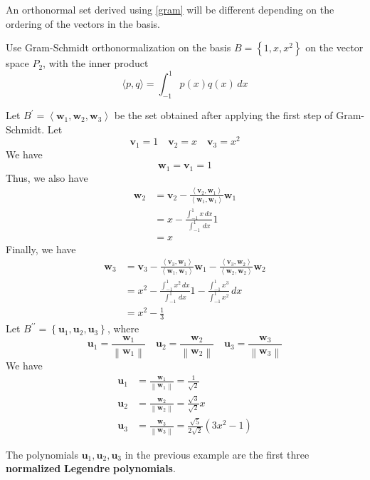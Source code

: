 \begin{remark}
    An orthonormal set derived using \ref{gram} will be different depending on the ordering of the vectors in the basis.
\end{remark}
\begin{exercise}
    Use Gram-Schmidt orthonormalization on the basis \(B=\left\{ 1,x,x^2 \right\} \) on the vector space \(P_2\), with the inner product
    \[
        \langle p,q \rangle = \int_{-1}^1 p(x)q(x)\,dx
    \]
\end{exercise}
\begin{longsolution}
    Let \(B^{\prime} =\left\langle \mathbf{w}_1,\mathbf{w}_2,\mathbf{w}_3 \right\rangle \) be the set obtained after applying the first step of Gram-Schmidt. Let
    \[
        \mathbf{v}_1 = 1\quad \mathbf{v}_2 = x\quad \mathbf{v}_3 = x^2
    \]
    We have
    \[
        \mathbf{w}_1 = \mathbf{v}_1 = 1
    \]
    Thus, we also have
    \begin{align*}
        \mathbf{w}_2 &= \mathbf{v}_2 -\frac{\left\langle \mathbf{v}_2,\mathbf{w}_1 \right\rangle }{\left\langle \mathbf{w}_1,\mathbf{w}_1 \right\rangle }\mathbf{w}_1\\
        &= x - \frac{\int_{-1}^1 x\,dx}{\int_{-1}^1 \,dx}1\\
        &= x
    \end{align*}
    Finally, we have
    \begin{align*}
        \mathbf{w}_{3}&= \mathbf{v}_3 - \frac{\left\langle \mathbf{v}_3,\mathbf{w}_1 \right\rangle }{\left\langle\mathbf{w}_1,\mathbf{w}_1 \right\rangle}\mathbf{w}_1 - \frac{\left\langle \mathbf{v}_3,\mathbf{w}_2 \right\rangle }{\left\langle\mathbf{w}_{2},\mathbf{w}_2 \right\rangle}\mathbf{w}_2\\
        &=x^2 - \frac{\int_{-1}^1 x^2\,dx}{\int_{-1}^1 \,dx}1 - \frac{\int_{-1}^1 x^3 }{\int_{-1}^1 x^2}\,dx\\
        &=x^2 - \frac{1}{3}
    \end{align*}
    Let \(B^{\prime\prime} =\left\{ \mathbf{u}_1,\mathbf{u}_2,\mathbf{u}_3 \right\} \), where 
    \[
        \mathbf{u}_1 = \frac{\mathbf{w}_1}{\left\lVert \mathbf{w}_1 \right\rVert }\quad\mathbf{u}_2 = \frac{\mathbf{w}_2}{\left\lVert \mathbf{w}_2 \right\rVert }\quad\mathbf{u}_3 = \frac{\mathbf{w}_3}{\left\lVert \mathbf{w}_3 \right\rVert }
    \]
    We have
    \begin{align*}
        \mathbf{u}_1 &= \frac{\mathbf{w}_1}{\left\lVert \mathbf{w}_1 \right\rVert }=\frac{1}{\sqrt{2} }\\
        \mathbf{u}_2 &=\frac{\mathbf{w}_2}{\left\lVert \mathbf{w}_2 \right\rVert }=\frac{\sqrt{3} }{\sqrt{2} }x\\
        \mathbf{u}_3 &= \frac{\mathbf{w}_3}{\left\lVert \mathbf{w}_3 \right\rVert }=\frac{\sqrt{5} }{2\sqrt{2} }\left( 3x^2 -1 \right) 
    \end{align*}
\end{longsolution}
\begin{remark}
    The polynomials \(\mathbf{u}_1,\mathbf{u}_2,\mathbf{u}_3\) in the previous example are the first three \textbf{normalized} \textbf{Legendre} \textbf{polynomials}.
\end{remark}